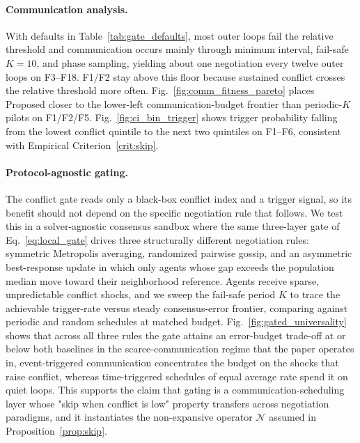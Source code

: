 \documentclass[conference]{IEEEtran}
\begin{document}
\paragraph{Communication analysis.} With defaults in Table~\ref{tab:gate_defaults}, most outer loops fail the relative threshold and communication occurs mainly through minimum interval, fail-safe $K{=}10$, and phase sampling, yielding about one negotiation every twelve outer loops on F3--F18. F1/F2 stay above this floor because sustained conflict crosses the relative threshold more often. Fig.~\ref{fig:comm_fitness_pareto} places Proposed closer to the lower-left communication-budget frontier than periodic-$K$ pilots on F1/F2/F5. Fig.~\ref{fig:ci_bin_trigger} shows trigger probability falling from the lowest conflict quintile to the next two quintiles on F1--F6, consistent with Empirical Criterion~\ref{crit:skip}.

\paragraph{Protocol-agnostic gating.} The conflict gate reads only a black-box conflict index and a trigger signal, so its benefit should not depend on the specific negotiation rule that follows. We test this in a solver-agnostic consensus sandbox where the same three-layer gate of Eq.~\eqref{eq:local_gate} drives three structurally different negotiation rules: symmetric Metropolis averaging, randomized pairwise gossip, and an asymmetric best-response update in which only agents whose gap exceeds the population median move toward their neighborhood reference. Agents receive sparse, unpredictable conflict shocks, and we sweep the fail-safe period $K$ to trace the achievable trigger-rate versus steady consensus-error frontier, comparing against periodic and random schedules at matched budget. Fig.~\ref{fig:gated_universality} shows that across all three rules the gate attains an error-budget trade-off at or below both baselines in the scarce-communication regime that the paper operates in, event-triggered communication concentrates the budget on the shocks that raise conflict, whereas time-triggered schedules of equal average rate spend it on quiet loops. This supports the claim that gating is a communication-scheduling layer whose "skip when conflict is low" property transfers across negotiation paradigms, and it instantiates the non-expansive operator $\mathcal{N}$ assumed in Proposition~\ref{prop:skip}.
\end{document}
